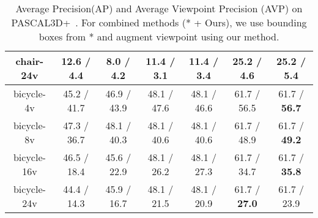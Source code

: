\begin{table*}[t]
\begin{center}
\begin{tabular}{|c||c||c||c|c||c|c|}
    chair-24v           & 12.6 / 4.4          & 8.0  / 4.2              &  11.4 / 3.1       & 11.4 / 3.4         & 25.2 / 4.6          & 25.2 / \textbf{5.4} \\ \hline
    \hline
    bicycle-4v          & 45.2 / 41.7         & 46.9 / 43.9             & 48.1 / 47.6       & 48.1 / 46.6        & 61.7 / 56.5         & 61.7 / \textbf{56.7}\\ \hline
    bicycle-8v          & 47.3 / 36.7         & 48.1 / 40.3             & 48.1 / 40.6       & 48.1 / 40.6        & 61.7 / 48.9         & 61.7 / \textbf{49.2}\\ \hline
    bicycle-16v         & 46.5 / 18.4         & 45.6 / 22.9             & 48.1 / 26.2       & 48.1 / 27.3        & 61.7 / 34.7         & 61.7 / \textbf{35.8}\\ \hline
    bicycle-24v         & 44.4 / 14.3         & 45.9 / 16.7             & 48.1 / 21.5       & 48.1 / 20.9        & 61.7 / \textbf{27.0}         & 61.7 / 23.9\\ \hline
    \end{tabular}
  \end{center}
\caption{Average Precision(AP) and Average Viewpoint Precision (AVP) on
  PASCAL3D+~\cite{Xiang14}. For combined methods (* + Ours), we use
  bounding boxes from * and augment viewpoint using our method.}
\label{tab:pascal12}
\end{table*}

\begin{comment}
\hline
boat-4v             & 3.0 / 1.5           & 0.5 / 0.3               &  /        &  /         & 27.9 / 11.3         & 27.9 / 11.5 \\ \hline
boat-8v             & 5.8 / 1.0           & 0.5 / 0.2               &  /        &  /         & 27.9 / 5.4          & 27.9 / 5.4 \\ \hline
boat-16v            & 6.2 / 0.5           & 0.7 / 0.3               &  /        &  /         & 27.9 / 2.0          & 27.9 / 2.0 \\ \hline
boat-24v            & 6.0 / 0.3           & 5.3 / 2.2               &  /        &  /         & 27.9 / 1.8          & 27.9 / 2.5 \\ \hline
\end{comment}

